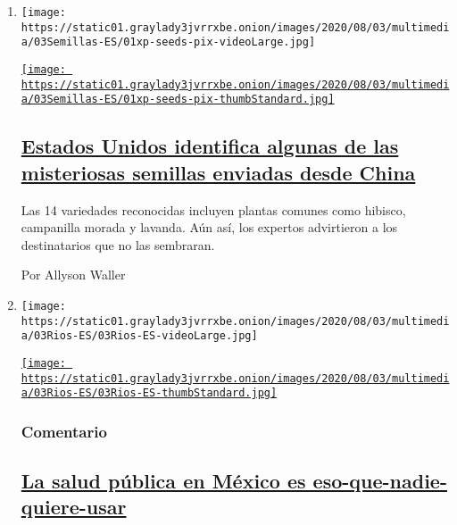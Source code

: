 \begin{enumerate}
\def\labelenumi{\arabic{enumi}.}
\item
  \texttt{[image: https://static01.graylady3jvrrxbe.onion/images/2020/08/03/multimedia/03Semillas-ES/01xp-seeds-pix-videoLarge.jpg]}

  \href{/es/2020/08/03/espanol/estados-unidos/semillas-correo-china.html}{\texttt{[image: https://static01.graylady3jvrrxbe.onion/images/2020/08/03/multimedia/03Semillas-ES/01xp-seeds-pix-thumbStandard.jpg]}}

  \hypertarget{estados-unidos-identifica-algunas-de-las-misteriosas-semillas-enviadas-desde-china}{%
  \subsection{\texorpdfstring{\href{/es/2020/08/03/espanol/estados-unidos/semillas-correo-china.html}{Estados
  Unidos identifica algunas de las misteriosas semillas enviadas desde
  China}}{Estados Unidos identifica algunas de las misteriosas semillas enviadas desde China}}\label{estados-unidos-identifica-algunas-de-las-misteriosas-semillas-enviadas-desde-china}}

  Las 14 variedades reconocidas incluyen plantas comunes como hibisco,
  campanilla morada y lavanda. Aún así, los expertos advirtieron a los
  destinatarios que no las sembraran.

  Por Allyson Waller
\item
  \texttt{[image: https://static01.graylady3jvrrxbe.onion/images/2020/08/03/multimedia/03Rios-ES/03Rios-ES-videoLarge.jpg]}

  \href{/es/2020/08/03/espanol/opinion/servicio-salud-mexico.html}{\texttt{[image: https://static01.graylady3jvrrxbe.onion/images/2020/08/03/multimedia/03Rios-ES/03Rios-ES-thumbStandard.jpg]}}

  \hypertarget{comentario}{%
  \subsubsection{Comentario}\label{comentario}}

  \hypertarget{la-salud-puxfablica-en-muxe9xico-es-eso-que-nadie-quiere-usar}{%
  \subsection{\texorpdfstring{\href{/es/2020/08/03/espanol/opinion/servicio-salud-mexico.html}{La
  salud pública en México es
  eso-que-nadie-quiere-usar}}{La salud pública en México es eso-que-nadie-quiere-usar}}\label{la-salud-puxfablica-en-muxe9xico-es-eso-que-nadie-quiere-usar}}


\end{enumerate}
